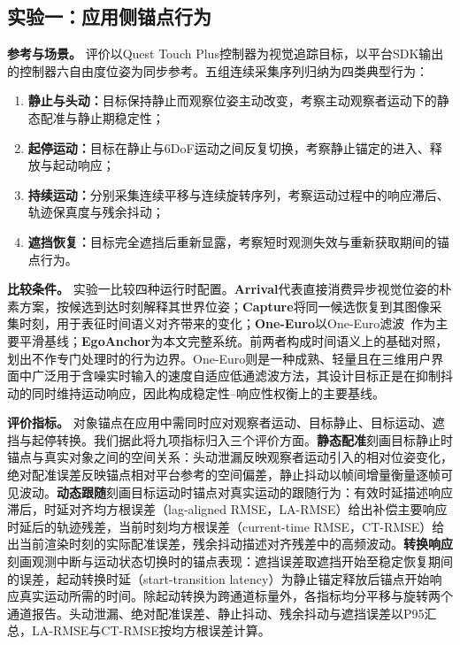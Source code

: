 \documentclass[review]{vgtc}
\begin{document}
\subsection{实验一：应用侧锚点行为}\label{sec:exp1-design}

\textbf{参考与场景。}
评价以Quest Touch Plus控制器为视觉追踪目标，以平台SDK输出的控制器六自由度位姿为同步参考。五组连续采集序列归纳为四类典型行为：
\begin{enumerate}
  \item \textbf{静止与头动：}目标保持静止而观察位姿主动改变，考察主动观察者运动下的静态配准与静止期稳定性；
  \item \textbf{起停运动：}目标在静止与6DoF运动之间反复切换，考察静止锚定的进入、释放与起动响应；
  \item \textbf{持续运动：}分别采集连续平移与连续旋转序列，考察运动过程中的响应滞后、轨迹保真度与残余抖动；
  \item \textbf{遮挡恢复：}目标完全遮挡后重新显露，考察短时观测失效与重新获取期间的锚点行为。
\end{enumerate}

\textbf{比较条件。}
实验一比较四种运行时配置。\textbf{Arrival}代表直接消费异步视觉位姿的朴素方案，按候选到达时刻解释其世界位姿；\textbf{Capture}将同一候选恢复到其图像采集时刻，用于表征时间语义对齐带来的变化；\textbf{One-Euro}以One-Euro滤波~\cite{casiez2012oneeuro}作为主要平滑基线；\textbf{EgoAnchor}为本文完整系统。前两者构成时间语义上的基础对照，划出不作专门处理时的行为边界。One-Euro则是一种成熟、轻量且在三维用户界面中广泛用于含噪实时输入的速度自适应低通滤波方法，其设计目标正是在抑制抖动的同时维持运动响应，因此构成稳定性--响应性权衡上的主要基线。


\textbf{评价指标。}
对象锚点在应用中需同时应对观察者运动、目标静止、目标运动、遮挡与起停转换。我们据此将九项指标归入三个评价方面。\textbf{静态配准}刻画目标静止时锚点与真实对象之间的空间关系：头动泄漏反映观察者运动引入的相对位姿变化，绝对配准误差反映锚点相对平台参考的空间偏差，静止抖动以帧间增量衡量逐帧可见波动。\textbf{动态跟随}刻画目标运动时锚点对真实运动的跟随行为：有效时延描述响应滞后，时延对齐均方根误差（lag-aligned RMSE，LA-RMSE）给出补偿主要响应时延后的轨迹残差，当前时刻均方根误差（current-time RMSE，CT-RMSE）给出当前渲染时刻的实际配准误差，残余抖动描述对齐残差中的高频波动。\textbf{转换响应}刻画观测中断与运动状态切换时的锚点表现：遮挡误差取遮挡开始至稳定恢复期间的误差，起动转换时延（start-transition latency）为静止锚定释放后锚点开始响应真实运动所需的时间。除起动转换为跨通道标量外，各指标均分平移与旋转两个通道报告。头动泄漏、绝对配准误差、静止抖动、残余抖动与遮挡误差以P95汇总，LA-RMSE与CT-RMSE按均方根误差计算。
\end{document}
